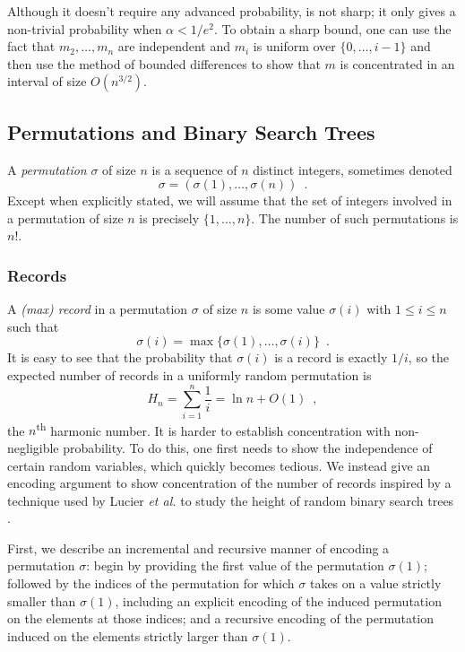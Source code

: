 \documentclass{patmorin}
\begin{document}
\begin{rem}
  Although it doesn't require any advanced probability,
   is not sharp; it only gives a non-trivial
  probability when $\alpha < 1/e^2$.  To obtain a sharp bound, one can
  use the fact that $m_2,\ldots,m_n$ are independent and $m_i$ is uniform
  over $\{0,\ldots,i-1\}$ and then use the method of bounded differences
  \cite{mcdiarmid:on} to show that $m$ is concentrated in an interval
  of size $O(n^{3/2})$.
\end{rem}

\subsection{Permutations and Binary Search Trees}

A \emph{permutation} $\sigma$ of size $n$ is a sequence of $n$
distinct integers, sometimes denoted
\[
\sigma = (\sigma(1), \ldots, \sigma(n)) \enspace .
\]
Except when explicitly stated, we will assume that the set of integers
involved in a permutation of size $n$ is precisely $\{1, \ldots,
n\}$. The number of such permutations is $n!$.

\subsubsection{Records}

A \emph{(max) record} in a permutation $\sigma$ of size $n$ is some
value $\sigma(i)$ with $1 \leq i \leq n$ such that
\[
\sigma(i) = \max\{\sigma(1), \ldots, \sigma(i)\} \enspace .
\]
It is easy to see that the probability that $\sigma(i)$ is a record is
exactly $1/i$, so the expected number of records in a uniformly random
permutation is
\[
H_n = \sum_{i = 1}^n \frac{1}{i} = \ln n + O(1) \enspace ,
\]
the $n$\textsuperscript{th} harmonic number. It is harder to establish
concentration with non-negligible probability. To do this, one first
needs to show the independence of certain random variables, which
quickly becomes tedious. We instead give an encoding argument to show
concentration of the number of records inspired by a technique used by
Lucier \emph{et al.} to study the height of random binary search trees
\cite{lucier.jiang.li:quicksort}.

First, we describe an incremental and recursive manner of encoding a
permutation $\sigma$: begin by providing the first value of the
permutation $\sigma(1)$; followed by the indices of the permutation
for which $\sigma$ takes on a value strictly smaller than $\sigma(1)$,
including an explicit encoding of the induced permutation on the
elements at those indices; and a recursive encoding of the permutation
induced on the elements strictly larger than $\sigma(1)$.
\end{document}

